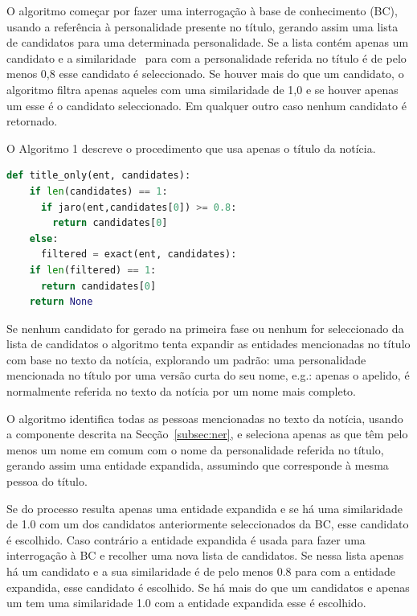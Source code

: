 \documentclass[a4paper, twocolumn, 11pt, twoside]{article}
\begin{document}
O algoritmo começar por fazer uma interrogação à base de conhecimento (BC), usando a referência à personalidade presente no título, gerando assim uma lista de candidatos para uma determinada personalidade. Se a lista contém apenas um candidato e a similaridade~\citep{jaro1989} para com a personalidade referida no título é de pelo menos 0,8 esse candidato é seleccionado. Se houver mais do que um candidato, o algoritmo filtra apenas aqueles com uma similaridade de 1,0 e se houver apenas um esse é o candidato seleccionado. Em qualquer outro caso nenhum candidato é retornado. 

O Algoritmo 1 descreve o procedimento que usa apenas o título da notícia.

\begin{lstlisting}[language=python,columns=fullflexible,frame=single,label={lst:alg1},title={Algoritmo 1. Ligação com a Wikidata usando apenas o título.},captionpos=b]
def title_only(ent, candidates):
    if len(candidates) == 1:
      if jaro(ent,candidates[0]) >= 0.8:
        return candidates[0]
    else:
      filtered = exact(ent, candidates):
	if len(filtered) == 1:
	  return candidates[0]
    return None
\end{lstlisting}

Se nenhum candidato for gerado na primeira fase ou nenhum for seleccionado da lista de candidatos o algoritmo tenta expandir as entidades mencionadas no título com base no texto da notícia, explorando um padrão: uma personalidade mencionada no título por uma versão curta do seu nome, e.g.: apenas o apelido, é normalmente referida no texto da notícia por um nome mais completo.

O algoritmo identifica todas as pessoas mencionadas no texto da notícia, usando a componente descrita na Secção~\ref{subsec:ner}, e seleciona apenas as que têm pelo menos um nome em comum com o nome da personalidade referida no título, gerando assim uma entidade expandida, assumindo que corresponde à mesma pessoa do título.

Se do processo resulta apenas uma entidade expandida e se há uma similaridade de 1.0 com um dos candidatos anteriormente seleccionados da BC, esse candidato é escolhido. Caso contrário a entidade expandida é usada para fazer uma interrogação à BC e recolher uma nova lista de candidatos. Se nessa lista apenas há um candidato e a sua similaridade é de pelo menos 0.8 para com a entidade expandida, esse candidato é escolhido. Se há mais do que um candidatos e apenas um tem uma similaridade 1.0 com a entidade expandida esse é escolhido. 
\end{document}

